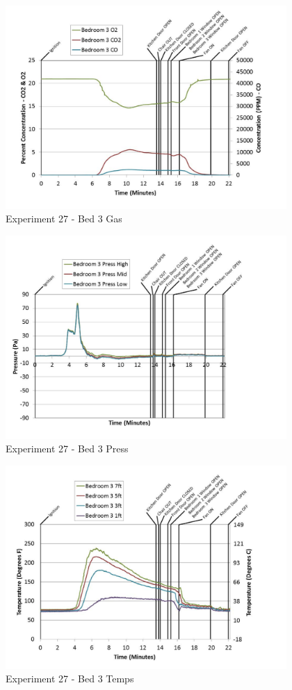 \documentclass{article}
\begin{document}
\begin{appendices}
	\begin{figure}[h!]
		\centering
		\includegraphics[height=3.05in]{0_Images/Results_Charts/Exp_27_Charts/Bed3Gas.pdf}
		\caption{Experiment 27 - Bed 3 Gas}
	\end{figure}
 
	\clearpage

	\begin{figure}[h!]
		\centering
		\includegraphics[height=3.05in]{0_Images/Results_Charts/Exp_27_Charts/Bed3Press.pdf}
		\caption{Experiment 27 - Bed 3 Press}
	\end{figure}
 

	\begin{figure}[h!]
		\centering
		\includegraphics[height=3.05in]{0_Images/Results_Charts/Exp_27_Charts/Bed3Temps.pdf}
		\caption{Experiment 27 - Bed 3 Temps}
	\end{figure}
 

\end{appendices}
\end{document}
